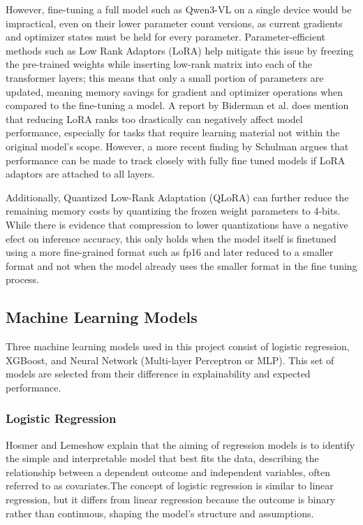 \documentclass[ %
                    author={Natchalin Iwsakul \\ Inkaphol Siriwongwattana \\ Tanaphan Kummaraphat \\ Patorn Srisupap},
                supervisor={Fernando Moreno-Pino},
                    degree={MSc},
                     title={Propensity Modelling for SME Commercial Lending Using Open Public Data},
                  subtitle={Companies House filings and GDELT media coverage as predictors of first-time borrowing},
                      type={},
                      year={2026}]{dissertation}
\begin{document}
However, fine-tuning a full model such as Qwen3-VL on a single device would be impractical, even on their lower parameter count versions, as current gradients and optimizer states must be held for every parameter. Parameter-efficient methods such as Low Rank Adaptors (LoRA)\cite{hu2021} help mitigate this issue by freezing the pre-trained weights while inserting low-rank matrix into each of the transformer layers; this means that only a small portion of parameters are updated, meaning memory savings for gradient and optimizer operations when compared to the fine-tuning a model. A report by Biderman et al. \cite{biderman2024lora} does mention that reducing LoRA ranks too drastically can negatively affect model performance, especially for tasks that require learning material not within the original model's scope. However, a more recent finding by Schulman \cite{schulman2025lora} argues that performance can be made to track closely with fully fine tuned models if LoRA adaptors are attached to all layers. 

Additionally, Quantized Low-Rank Adaptation (QLoRA) \cite{dettmers2023} can further reduce the remaining memory costs by quantizing the frozen weight parameters to 4-bits. While there is evidence that compression to lower quantizations have a negative efect on inference accuracy, this only holds when the model itself is finetuned using a more fine-grained format such as fp16 and later reduced to a smaller format and not when the model already uses the smaller format in the fine tuning process\cite{dettmers2022}.


\subsection{Machine Learning Models}
\label{sec:mlmodels}
Three machine learning models used in this project consist of logistic regression, XGBoost, and Neural Network (Multi-layer Perceptron or MLP). This set of models are selected from their difference in explainability and expected performance. 

\subsubsection{Logistic Regression}
\label{sec:logisticregression}


Hosmer and Lemeshow \cite{hosmer_applied_2013} explain that the aiming of regression models is to identify the simple and interpretable model that best fits the data, describing the relationship between a dependent outcome and independent variables, often referred to as covariates.The concept of logistic regression is similar to linear regression, but it differs from linear regression because the outcome is binary rather than continuous, shaping the model's structure and assumptions.
\end{document}
